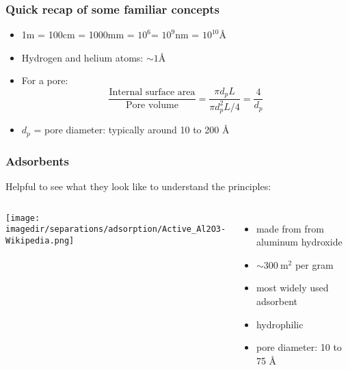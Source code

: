 \begin{frame}\frametitle{Quick recap of some familiar concepts}
	\begin{itemize}
		\item	1m = 100cm = 1000mm = $10^6$\micron = $10^9$nm = $10^{10}$\AA
		\item	Hydrogen and helium atoms: $\sim 1$\AA
		\item	For a pore: \[\frac{\text{Internal surface area}}{\text{Pore volume}} = \frac{\pi d_p L}{\pi d_p^2 L/4} = \frac{4}{d_p}\]
		\item	$d_p$ = pore diameter: typically around 10 to 200 \AA
	\end{itemize}
\end{frame}

\begin{frame}\frametitle{Adsorbents}
	Helpful to see what they look like to understand the principles:	
	\begin{columns}[c]
			\begin{center}
				\texttt{[image: \\imagedir/separations/adsorption/Active\_Al2O3-Wikipedia.png]}
			\end{center}
			\vspace{-12pt}
			{\color{myGreen}{Activated alumina}}
			
			\begin{itemize}
				\item	made from from aluminum hydroxide
				\item	$\sim 300~\text{m}^2$ per gram
				\item	most widely used adsorbent
				\item	hydrophilic
				\item	pore diameter: 10 to 75 \AA
			\end{itemize} 
	\end{columns}
\end{frame}

